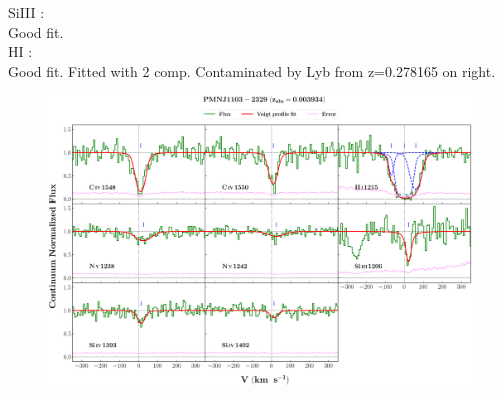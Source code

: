 \documentclass[12pt]{report}
\begin{document}
SiIII :  \\  \hspace*{1.5cm} 
        Good fit.  \\

HI :  \\  \hspace*{1.5cm} 
        Good fit. Fitted with 2 comp. Contaminated by Lyb from z=0.278165 on right.  \\



\newpage

\begin{landscape}

\begin{figure}
    \centering
    \vspace{-20mm}
    \hspace*{-35mm}
    \includegraphics[width=1.25\linewidth]{System-Plots/PMNJ1103-2329_z=0.003934_sys_plot.png}
\end{figure}

\end{landscape}
\end{document}
